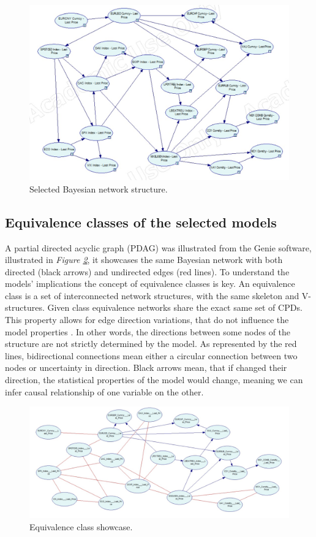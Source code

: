 \documentclass[12pt, letterpaper]{article}
\begin{document}
\begin{figure}[ht]
\centering
\includegraphics[width=1\textwidth]{graphics/GenieBN.jpeg}
\caption{Selected Bayesian network structure.}
\label{fig:bayesnet}
\end{figure}

\subsection{Equivalence classes of the selected models}

A partial directed acyclic graph (PDAG) was illustrated from the Genie software, illustrated in \textit{Figure \ref{fig:equlavenceclass}}, it showcases the same Bayesian network with both directed (black arrows) and undirected edges (red lines). To understand the models’ implications the concept of equivalence classes is key. An equivalence class is a set of interconnected network structures, with the same skeleton and V-structures. Given class equivalence networks share the exact same set of CPDs. This property allows for edge direction variations, that do not influence the model properties \parencite{chickering2013}. In other words, the directions between some nodes of the structure are not strictly determined by the model. As represented by the red lines, bidirectional connections mean either a circular connection between two nodes or uncertainty in direction. Black arrows mean, that if changed their direction, the statistical properties of the model would change, meaning we can infer causal relationship of one variable on the other.

\begin{figure}[ht]
\centering
\includegraphics[width=1\textwidth]{graphics/equvalenceclass.jpeg}
\caption{Equivalence class showcase.}
\label{fig:equlavenceclass}
\end{figure}
\end{document}
